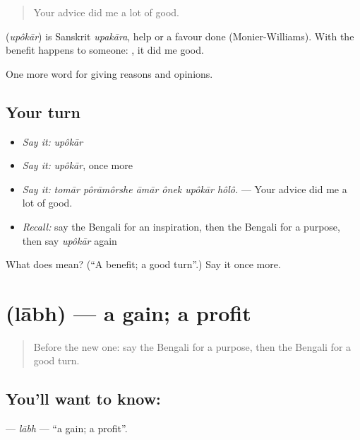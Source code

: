 \begin{quote}
Your advice did me a lot of good.
\end{quote}

\begin{cousinweb}
\textbf{} (\emph{upôkār}) is Sanskrit \emph{upakāra}, help or a favour done (Monier-Williams). With  the benefit happens to someone:   , it did me good.
\end{cousinweb}

\begin{grammarlens}[title={What you've built}]
One more word for giving reasons and opinions.
\end{grammarlens}

\subsection*{Your turn}
\begin{itemize}
\raggedright
  \item \emph{Say it:} \emph{upôkār}
  \item \emph{Say it:} \emph{upôkār}, once more
  \item \emph{Say it:} \emph{tomār pôrāmôrshe āmār ônek upôkār hôlô.} — Your advice did me a lot of good.
  \item \emph{Recall:} say the Bengali for an inspiration, then the Bengali for a purpose, then say \emph{upôkār} again
\end{itemize}

\begin{tcolorbox}[breakable,colback=teal!4,colframe=teal!35!black,title={Before you move on}]
What does  mean? (\textquotedblleft{}A benefit; a good turn\textquotedblright{}.) Say it once more.
\end{tcolorbox}
\section[\texorpdfstring{\bn{লাভ} (lābh)}{লাভ (lābh)}]{ (lābh) — a gain; a profit}

\label{lesson:BN-C331-labh}



\begin{quote}
Before the new one: say the Bengali for a purpose, then the Bengali for a good turn.
\end{quote}

\subsection*{You'll want to know: }
\textbf{} — \emph{lābh} — \textquotedblleft{}a gain; a profit\textquotedblright{}.

